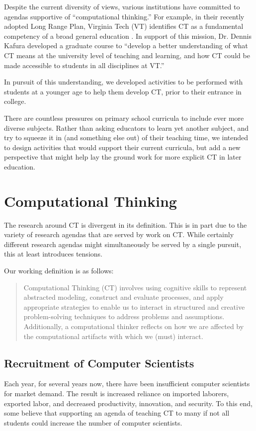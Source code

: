 \documentclass{acm_proc_article-sp}
\begin{document}
Despite the current diversity of views, various institutions have committed to agendas supportive of ``computational thinking.'' 
For example, in their recently adopted Long Range Plan, Virginia Tech (VT) identifies CT as a fundamental competency of a broad general education \cite{vtlongrange}. 
In support of this mission, Dr. Dennis Kafura developed a graduate course to ``develop a better understanding of what CT means at the university level of teaching and learning, and how CT could be made accessible to students in all disciplines at VT.''

In pursuit of this understanding, we developed activities to be performed with students at a younger age to help them develop CT, prior to their entrance in college.

There are countless pressures on primary school curricula to include ever more diverse subjects. Rather than asking educators to learn yet another subject, and try to squeeze it in (and something else out) of their teaching time, we intended to design activities that would support their current curricula, but add a new perspective that might help lay the ground work for more explicit CT in later education.

\section{Computational Thinking}
The research around CT is divergent in its definition. This is in part due to the variety of research agendas that are served by work on CT. While certainly different research agendas might simultaneously be served by a single pursuit, this at least introduces tensions. 

Our working definition is as follows: 
\begin{quotation}
Computational Thinking (CT) involves using cognitive skills to represent abstracted modeling, construct and evaluate processes, and apply appropriate strategies to enable us to interact in structured and creative problem-solving techniques to address problems and assumptions. Additionally, a computational thinker reflects on how we are affected by the computational artifacts with which we (must) interact.
\end{quotation}

\subsection{Recruitment of Computer Scientists}
Each year, for several years now, there have been insufficient computer scientists for market demand. The result is increased reliance on imported laborers, exported labor, and decreased productivity, innovation, and security. To this end, some believe that supporting an agenda of teaching CT to many if not all students could increase the number of computer scientists.
\end{document}
